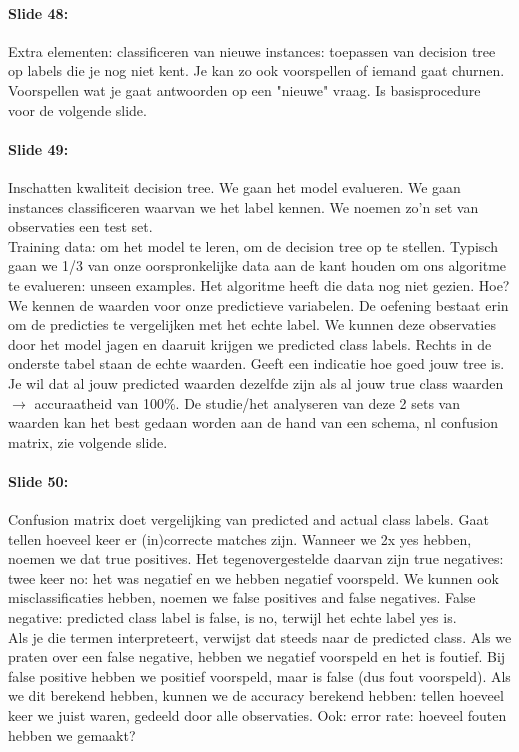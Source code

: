 \documentclass[10pt,a4paper]{report}
\begin{document}
\paragraph{Slide 48:}Extra elementen: classificeren van nieuwe instances: toepassen van decision tree op labels die je nog niet kent. Je kan zo ook voorspellen of iemand gaat churnen. Voorspellen wat je gaat antwoorden op een "nieuwe" vraag. Is basisprocedure voor de volgende slide.

\paragraph{Slide 49:}Inschatten kwaliteit decision tree. We gaan het model evalueren. We gaan instances classificeren waarvan we het label kennen. We noemen zo'n set van observaties een test set.\\
Training data: om het model te leren, om de decision tree op te stellen. Typisch gaan we 1/3 van onze oorspronkelijke data aan de kant houden om ons algoritme te evalueren: unseen examples. Het algoritme heeft die data nog niet gezien. Hoe? We kennen de waarden voor onze predictieve variabelen. De oefening bestaat erin om de predicties te vergelijken met het echte label. We kunnen deze observaties door het model jagen en daaruit krijgen we predicted class labels. Rechts in de onderste tabel staan de echte waarden. Geeft een indicatie hoe goed jouw tree is. Je wil dat al jouw predicted waarden dezelfde zijn als al jouw true class waarden $\rightarrow$ accuraatheid van 100\%. De studie/het analyseren van deze 2 sets van waarden kan het best gedaan worden aan de hand van een schema, nl confusion matrix, zie volgende slide.

\paragraph{Slide 50: }Confusion matrix doet vergelijking van predicted and actual class labels. Gaat tellen hoeveel keer er (in)correcte matches zijn. Wanneer we 2x yes hebben, noemen we dat true positives. Het tegenovergestelde daarvan zijn true negatives: twee keer no: het was negatief en we hebben negatief voorspeld. 
We kunnen ook misclassificaties hebben, noemen we false positives and false negatives. False negative: predicted class label is false, is no, terwijl het echte label yes is.\\
Als je die termen interpreteert, verwijst dat steeds naar de predicted class. Als we praten over een false negative, hebben we negatief voorspeld en het is foutief. Bij false positive hebben we positief voorspeld, maar is false (dus fout voorspeld). Als we dit berekend hebben, kunnen we de accuracy berekend hebben: tellen hoeveel keer we juist waren, gedeeld door alle observaties. Ook: error rate: hoeveel fouten hebben we gemaakt?
\end{document}
